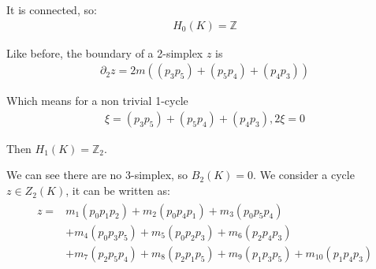 \documentclass[]{ctexart}
\newcommand{\pa}{\partial}
\begin{document}
\begin{center}
\begin{tikzpicture}[x=0.75pt,y=0.75pt,yscale=-1,xscale=1]
					
					\end{tikzpicture}
					
				\end{center}
			
			It is connected, so:
				\begin{equation*}
				\begin{aligned}
					H_0(K)=\mathbb{Z}
				\end{aligned}
				\end{equation*}
				
			Like before, the boundary of a 2-simplex $z$ is
				\begin{equation*}
				\begin{aligned}
					\pa_2z=2m\left((p_3p_5)+(p_5p_4)+(p_4p_3)\right)
				\end{aligned}
				\end{equation*}
				
			Which means for a non trivial 1-cycle
				\begin{equation*}
				\begin{aligned}
					\xi=(p_3p_5)+(p_5p_4)+(p_4p_3), 2\xi=0
				\end{aligned}
				\end{equation*}
			
			Then $H_1(K)=\mathbb{Z}_2$. 
			
			We can see there are no 3-simplex, so $B_2(K)=0$. We consider a cycle $z\in Z_2(K)$, it can be written as:
				\begin{equation*}
				\begin{aligned}
					\begin{aligned}
					z=& m_{1}\left(p_{0} p_{1} p_{2}\right)+m_{2}\left(p_{0} p_{4} p_{1}\right)+m_{3}\left(p_{0} p_{5} p_{4}\right) \\
					&+m_{4}\left(p_{0} p_{3} p_{5}\right)+m_{5}\left(p_{0} p_{2} p_{3}\right)+m_{6}\left(p_{2} p_{4} p_{3}\right) \\
					&+m_{7}\left(p_{2} p_{5} p_{4}\right)+m_{8}\left(p_{2} p_{1} p_{5}\right)+m_{9}\left(p_{1} p_{3} p_{5}\right)+m_{10}\left(p_{1} p_{4} p_{3}\right)
					\end{aligned}
				\end{aligned}
				\end{equation*}
		
\end{document}
